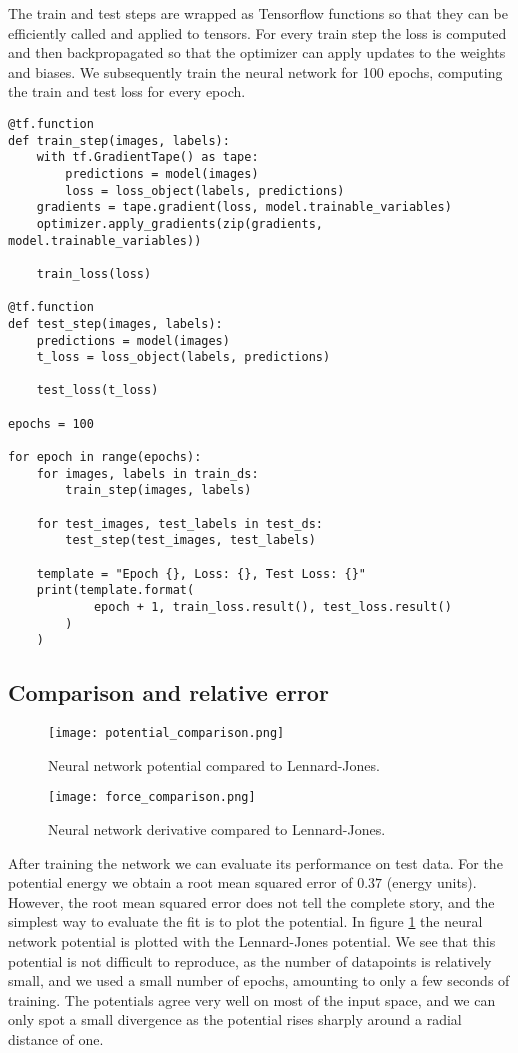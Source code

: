 The train and test steps are wrapped as  Tensorflow functions
so that they can be efficiently called and applied to tensors.
For every train step the loss is computed and then backpropagated
so that the optimizer can apply updates to the weights and biases.
We subsequently train the neural network for 100 epochs, computing
the train and test loss for every epoch.

\begin{verbatim}
@tf.function
def train_step(images, labels):
    with tf.GradientTape() as tape:
        predictions = model(images)
        loss = loss_object(labels, predictions)
    gradients = tape.gradient(loss, model.trainable_variables)
    optimizer.apply_gradients(zip(gradients, model.trainable_variables))

    train_loss(loss)

@tf.function
def test_step(images, labels):
    predictions = model(images)
    t_loss = loss_object(labels, predictions)

    test_loss(t_loss)

epochs = 100

for epoch in range(epochs):
    for images, labels in train_ds:
        train_step(images, labels)

    for test_images, test_labels in test_ds:
        test_step(test_images, test_labels)

    template = "Epoch {}, Loss: {}, Test Loss: {}"
    print(template.format(
            epoch + 1, train_loss.result(), test_loss.result()
        )
    )
\end{verbatim}

\subsection{Comparison and relative error}

\begin{figure}[h]
    \centering
    \texttt{[image: potential\_comparison.png]}
    \caption{Neural network potential compared to Lennard-Jones.}
    \label{fig:potential-comparison}
\end{figure}

\begin{figure}[h]
    \centering
    \texttt{[image: force\_comparison.png]}
    \caption{Neural network derivative compared to Lennard-Jones.}
    \label{fig:force-comparison}
\end{figure}

After training the network we can evaluate its performance
on test data. 
For the potential energy we obtain a root mean squared error of
$0.37$ (energy units).
However, the root mean squared error does not tell the complete story,
and the simplest way to evaluate the fit is to plot the potential.
In figure \ref{fig:potential-comparison} the neural network potential
is plotted with the Lennard-Jones potential.
We see that this potential is not difficult to reproduce,
as the number of datapoints is relatively small, and we used
a small number of epochs, amounting to only a few seconds of training.
The potentials agree very well on most of the input space, and we can
only spot a small divergence as the potential rises sharply
around a radial distance of one.

